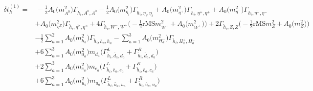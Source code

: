 \begin{align} 
\delta t^{(1)}_{h} = & \, -\frac{1}{2} {A_0\Big(m^2_{A^0}\Big)} {\Gamma_{\check{h}_{{i}},A^0,A^0}} -\frac{1}{2} {A_0\Big(m^2_{\eta_i}\Big)} {\Gamma_{\check{h}_{{i}},\eta_i,\eta_i}} +{A_0\Big(m^2_{\eta^+}\Big)} {\Gamma_{\check{h}_{{i}},\bar{\eta^+},\eta^+}} +{A_0\Big(m^2_{\eta^-}\Big)} {\Gamma_{\check{h}_{{i}},\bar{\eta^-},\eta^-}} \nonumber \\ 
 &+{A_0\Big(m^2_{\eta^Z}\Big)} {\Gamma_{\check{h}_{{i}},\bar{\eta^Z},\eta^Z}} +4 {\Gamma_{\check{h}_{{i}},W^-,W^+}} \Big(-\frac{1}{2} \text{rMS} m^2_{W^+}  + {A_0\Big(m^2_{W^+}\Big)}\Big)+2 {\Gamma_{\check{h}_{{i}},Z,Z}} \Big(-\frac{1}{2} \text{rMS} m^2_{Z}  + {A_0\Big(m^2_{Z}\Big)}\Big)\nonumber \\ 
 &-\frac{1}{2} \sum_{a=1}^{2}{A_0\Big(m^2_{h_{{a}}}\Big)} {\Gamma_{\check{h}_{{i}},h_{{a}},h_{{a}}}}  - \sum_{a=1}^{3}{A_0\Big(m^2_{H^-_{{a}}}\Big)} {\Gamma_{\check{h}_{{i}},H^+_{{a}},H^-_{{a}}}}  \nonumber \\ 
 &+6 \sum_{a=1}^{3}{A_0\Big(m^2_{d_{{a}}}\Big)} m_{d_{{a}}} \Big({\Gamma^L_{\check{h}_{{i}},\bar{d}_{{a}},d_{{a}}}} + {\Gamma^R_{\check{h}_{{i}},\bar{d}_{{a}},d_{{a}}}}\Big) \nonumber \\ 
 &+2 \sum_{a=1}^{3}{A_0\Big(m^2_{e_{{a}}}\Big)} m_{e_{{a}}} \Big({\Gamma^L_{\check{h}_{{i}},\bar{e}_{{a}},e_{{a}}}} + {\Gamma^R_{\check{h}_{{i}},\bar{e}_{{a}},e_{{a}}}}\Big) \nonumber \\ 
 &+6 \sum_{a=1}^{3}{A_0\Big(m^2_{u_{{a}}}\Big)} m_{u_{{a}}} \Big({\Gamma^L_{\check{h}_{{i}},\bar{u}_{{a}},u_{{a}}}} + {\Gamma^R_{\check{h}_{{i}},\bar{u}_{{a}},u_{{a}}}}\Big)  
\end{align} 

